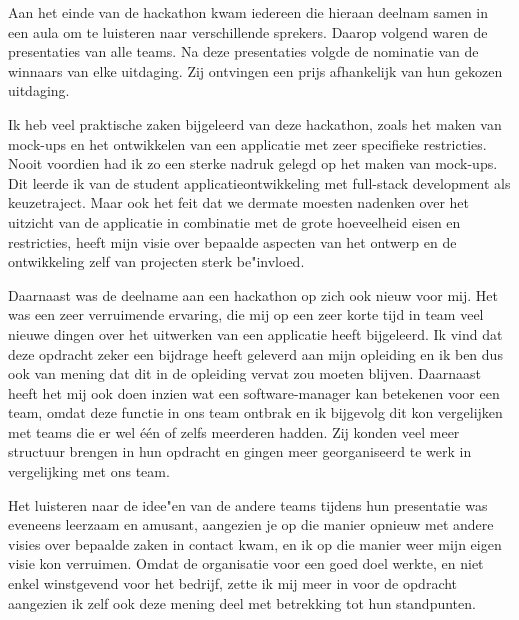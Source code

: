 Aan het einde van de hackathon kwam iedereen die hieraan deelnam samen in een aula om te luisteren naar verschillende sprekers. Daarop volgend waren de presentaties van alle teams. Na deze presentaties volgde de nominatie van de winnaars van elke uitdaging. Zij ontvingen een prijs afhankelijk van hun gekozen uitdaging.

Ik heb veel praktische zaken bijgeleerd van deze hackathon, zoals het maken van mock\hyp{}ups en het ontwikkelen van een applicatie met zeer specifieke restricties. Nooit voordien had ik zo een sterke nadruk gelegd op het maken van mock\hyp{}ups. Dit leerde ik van de student applicatieontwikkeling met full\hyp{}stack development als keuzetraject. Maar ook het feit dat we dermate moesten nadenken over het uitzicht van de applicatie in combinatie met de grote hoeveelheid eisen en restricties, heeft mijn visie over bepaalde aspecten van het ontwerp en de ontwikkeling zelf van projecten sterk be"invloed.

Daarnaast was de deelname aan een hackathon op zich ook nieuw voor mij. Het was een zeer verruimende ervaring, die mij op een zeer korte tijd in team veel nieuwe dingen over het uitwerken van een applicatie heeft bijgeleerd. Ik vind dat deze opdracht zeker een bijdrage heeft geleverd aan mijn opleiding en ik ben dus ook van mening dat dit in de opleiding vervat zou moeten blijven. Daarnaast heeft het mij ook doen inzien wat een software\hyp{}manager kan betekenen voor een team, omdat deze functie in ons team ontbrak en ik bijgevolg dit kon vergelijken met teams die er wel één of zelfs meerderen hadden. Zij konden veel meer structuur brengen in hun opdracht en gingen meer georganiseerd te werk in vergelijking met ons team.

Het luisteren naar de idee"en van de andere teams tijdens hun presentatie was eveneens leerzaam en amusant, aangezien je op die manier opnieuw met andere visies over bepaalde zaken in contact kwam, en ik op die manier weer mijn eigen visie kon verruimen. Omdat de organisatie voor een goed doel werkte, en niet enkel winstgevend voor het bedrijf, zette ik mij meer in voor de opdracht aangezien ik zelf ook deze mening deel met betrekking tot hun standpunten.

